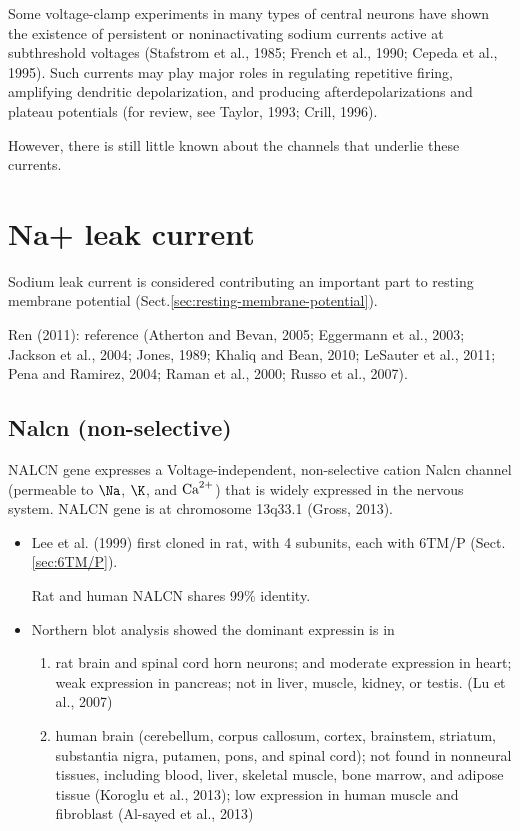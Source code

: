 Some voltage-clamp experiments in many types of central neurons have shown the
existence of persistent or noninactivating sodium currents active at
subthreshold voltages (Stafstrom et al., 1985; French et al., 1990; Cepeda et
al., 1995). Such currents may play major roles in regulating repetitive firing,
amplifying dendritic depolarization, and producing afterdepolarizations and
plateau potentials (for review, see Taylor, 1993; Crill, 1996).

However, there is still little known about the channels that underlie these
currents.



 
\section{Na+ leak current}
\label{sec:Na-leak-channel}
\label{sec:leak-Na-channel}

Sodium leak current is considered contributing an important part to resting
membrane potential (Sect.\ref{sec:resting-membrane-potential}).

Ren (2011): reference (Atherton and Bevan, 2005; Eggermann et al., 2003; Jackson
et al., 2004; Jones, 1989; Khaliq and Bean, 2010; LeSauter et al., 2011; Pena
and Ramirez, 2004; Raman et al., 2000; Russo et al., 2007).


\subsection{Nalcn (non-selective)}
\label{sec:NALCN}
\label{sec:Nalcn}

NALCN gene expresses a  Voltage-independent, non-selective cation Nalcn channel
(permeable to $\Na$, $\K$, and ${\text{Ca}^{2+}}$) that is widely expressed in the nervous
system. NALCN gene is at chromosome 13q33.1 (Gross, 2013).

\begin{itemize}
  \item Lee et al. (1999) first cloned in rat, with 4 subunits, each with 6TM/P
  (Sect.\ref{sec:6TM/P}).
  
  Rat and human NALCN shares 99\% identity.
  
  \item Northern blot analysis showed the dominant expressin is in 
  \begin{enumerate}
    
    \item  rat brain and  spinal cord horn neurons; and moderate expression in
    heart; weak expression in pancreas; not in  liver, muscle, kidney, or
    testis. (Lu et al., 2007)
  
    \item human brain (cerebellum, corpus callosum, cortex, brainstem, striatum,
    substantia nigra, putamen, pons, and spinal cord); not found in 
    nonneural tissues, including blood, liver, skeletal muscle, bone marrow, and
    adipose tissue (Koroglu et al., 2013); low expression in human muscle and
    fibroblast (Al-sayed et al., 2013)
  \end{enumerate}
  
\end{itemize}

